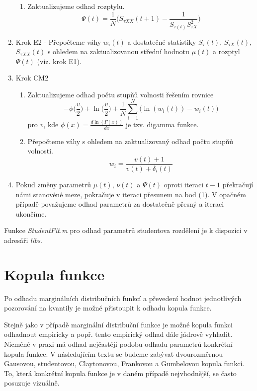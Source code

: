 \begin{enumerate}
\begin{enumerate}
\item Zaktualizujeme odhad rozptylu.
\begin{equation*}
\Psi(t) = \frac{1}{N}\Big(S_{\tau XX}(t + 1) - \frac{1}{S_{\tau (t)}S_{\tau X}^2}\Big)
\end{equation*}
\end{enumerate}
\item Krok E2 - Přepočteme váhy $w_i(t)$ a dostatečné statistiky $S_{\tau}(t)$, $S_{\tau X}(t)$, $S_{\tau XX}(t)$ s ohledem na zaktualizovanou střední hodnotu $\mu(t)$ a rozptyl $\Psi(t)$ (viz. krok E1).
\item Krok CM2
\begin{enumerate}
\item Zaktualizujeme odhad počtu stupňů volnosti řešením rovnice
\begin{equation*}
-\phi\big(\frac{v}{2}\big) + \ln \big(\frac{v}{2}\big) + \frac{1}{N}\sum_{i = 1}^N \Big(\ln(w_i(t)) - w_i(t)\Big)
\end{equation*}
pro $v$, kde $\phi(x) = \frac{d \ln(\Gamma(x))}{dx}$ je tzv. digamma funkce.
\item Přepočteme váhy s ohledem na zaktualizovaný odhad počtu stupňů volnosti.
\begin{equation*}
w_i = \frac{v(t) + 1}{v(t) + \delta_i(t)}
\end{equation*}
\end{enumerate}
\item Pokud změny parametrů $\mu(t)$, $\nu(t)$ a $\Psi(t)$ oproti iteraci $t-1$ překračují námi stanovéné meze, pokračuje v iteraci přesunem na bod (1). V opačném případě považujeme odhad parametrů za dostatečně přesný a iteraci ukončíme.
\end{enumerate}

Funkce \textit{StudentFit.m} pro odhad parametrů studentova rozdělení je k dispozici v adresáři \textit{libs}.

\section{Kopula funkce}

Po odhadu marginálních distribučních funkcí a převedení hodnot jednotlivých pozorování na kvantily je možné přistoupit k odhadu kopula funkce.

Stejně jako v případě marginální distribuční funkce je možné kopula funkci odhadnout empiricky a popř. tento empirický odhad dále jádrově vyhladit. Nicméně v praxi má odhad nejčastěji podobu odhadu parametrů konkrétní kopula funkce. V následujícím textu se budeme zabývat dvourozměrnou Gausovou, studentovou, Claytonovou, Frankovou a Gumbelovou kopula funkcí. To, která konkrétní kopula funkce je v daném případě nejvhodnější, se často posuzuje vizuálně.


